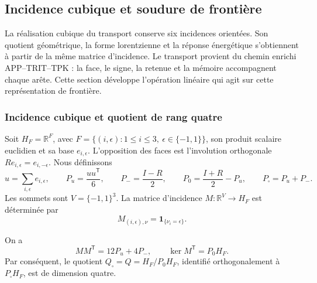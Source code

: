 
\subsection{Incidence cubique et soudure de frontière}
\label{vii:sec:pantalla-respuesta}

La réalisation cubique du transport conserve six incidences orientées.
Son quotient géométrique, la forme lorentzienne et la réponse énergétique
s’obtiennent à partir de la même matrice d’incidence. Le transport provient du
chemin enrichi APP--TRIT--TPK : la face, le signe, la retenue et la
mémoire accompagnent chaque arête. Cette section développe
l’opération linéaire qui agit sur cette représentation de frontière.

\subsubsection{Incidence cubique et quotient de rang quatre}
\label{vii:sec:cociente-pantalla}

Soit \(H_F=\mathbb R^F\), avec
\(F=\{(i,\epsilon):1\leq i\leq3,\ \epsilon\in\{-1,1\}\}\),
son produit scalaire euclidien et sa base \(e_{i,\epsilon}\).
L'opposition des faces est l'involution orthogonale
\(Re_{i,\epsilon}=e_{i,-\epsilon}\). Nous définissons
\[
 u=\sum_{i,\epsilon}e_{i,\epsilon},\qquad
 P_u=\frac{uu^{\mathsf T}}6,\qquad P_-=\frac{I-R}{2},\qquad
 P_0=\frac{I+R}{2}-P_u,\qquad P_\square=P_u+P_-.
\]
Les sommets sont \(V=\{-1,1\}^3\). La matrice d'incidence \(M:\mathbb R^V\longrightarrow H_F\) est déterminée par
\[
 M_{(i,\epsilon),\nu}=\mathbf1_{\{\nu_i=\epsilon\}}.
\]

\begin{proposition}
\label{vii:prop:incidencia}
On a
\[
 MM^{\mathsf T}=12P_u+4P_-,
 \qquad
 \ker M^{\mathsf T}=P_0H_F.
\]
Par conséquent, le quotient
\(Q_\square=Q=H_F/P_0H_F\), identifié orthogonalement à
\(P_\square H_F\), est de dimension quatre.
\end{proposition}


